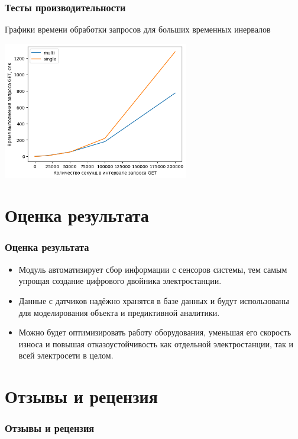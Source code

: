 \documentclass[pdf, hyperref={unicode}, aspectratio=169]{beamer}
\begin{document}
\begin{frame}
	\frametitle{Тесты производительности}
	
	Графики времени обработки запросов для больших временных инервалов
	
	\begin{center}
		\includegraphics[height = 6cm]{bench2e5.png}
	\end{center}
\end{frame}


\section{Оценка результата}
\begin{frame}
	\frametitle{Оценка результата}
	
	\begin{itemize}
		\item Модуль автоматизирует сбор информации с сенсоров системы, тем самым упрощая создание цифрового двойника электростанции.
		\item Данные с датчиков надёжно хранятся в базе данных и будут использованы для моделирования объекта и предиктивной аналитики.
		\item Можно будет оптимизировать работу оборудования, уменьшая его скорость износа и повышая отказоустойчивость как отдельной электростанции, так и всей электросети в целом.
	\end{itemize}
\end{frame}


\section{Отзывы и рецензия}
\begin{frame}
	\frametitle{Отзывы и рецензия}
	
	\begin{columns}
		
	\end{columns}
\end{frame}
\end{document}
